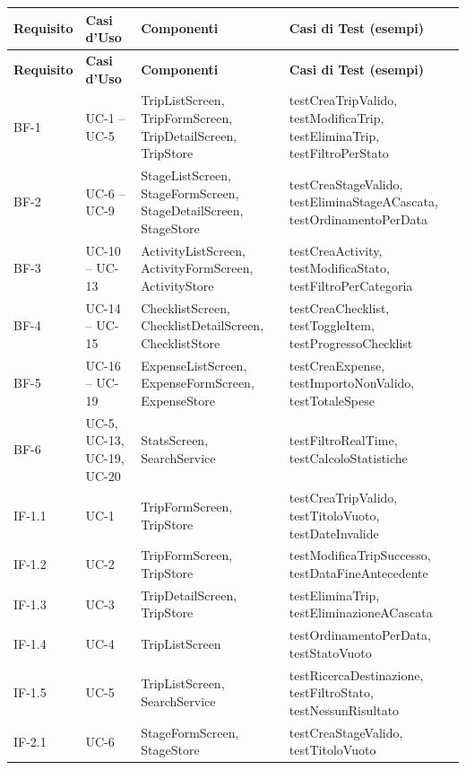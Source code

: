 \documentclass[12pt, a4paper]{article}
\begin{document}
\begingroup
\small
\setlength{\tabcolsep}{4pt}
\begin{longtable}{@{}L{1.8cm}L{3.5cm}L{3.5cm}L{5.2cm}@{}}
  \toprule
  \textbf{Requisito} & \textbf{Casi d'Uso} & \textbf{Componenti} & \textbf{Casi di Test (esempi)} \\
  \midrule
  \endfirsthead
  \toprule
  \textbf{Requisito} & \textbf{Casi d'Uso} & \textbf{Componenti} & \textbf{Casi di Test (esempi)} \\
  \midrule
  \endhead
  \bottomrule
  \endlastfoot

  BF-1 & UC-1 -- UC-5 & TripListScreen, TripFormScreen, TripDetailScreen, TripStore &
    testCreaTripValido, testModificaTrip, testEliminaTrip, testFiltroPerStato \\
  BF-2 & UC-6 -- UC-9 & StageListScreen, StageFormScreen, StageDetailScreen, StageStore &
    testCreaStageValido, testEliminaStageACascata, testOrdinamentoPerData \\
  BF-3 & UC-10 -- UC-13 & ActivityListScreen, ActivityFormScreen, ActivityStore &
    testCreaActivity, testModificaStato, testFiltroPerCategoria \\
  BF-4 & UC-14 -- UC-15 & ChecklistScreen, ChecklistDetailScreen, ChecklistStore &
    testCreaChecklist, testToggleItem, testProgressoChecklist \\
  BF-5 & UC-16 -- UC-19 & ExpenseListScreen, ExpenseFormScreen, ExpenseStore &
    testCreaExpense, testImportoNonValido, testTotaleSpese \\
  BF-6 & UC-5, UC-13, UC-19, UC-20 & StatsScreen, SearchService &
    testFiltroRealTime, testCalcoloStatistiche \\
  \midrule
  IF-1.1 & UC-1 & TripFormScreen, TripStore &
    testCreaTripValido, testTitoloVuoto, testDateInvalide \\
  IF-1.2 & UC-2 & TripFormScreen, TripStore &
    testModificaTripSuccesso, testDataFineAntecedente \\
  IF-1.3 & UC-3 & TripDetailScreen, TripStore &
    testEliminaTrip, testEliminazioneACascata \\
  IF-1.4 & UC-4 & TripListScreen &
    testOrdinamentoPerData, testStatoVuoto \\
  IF-1.5 & UC-5 & TripListScreen, SearchService &
    testRicercaDestinazione, testFiltroStato, testNessunRisultato \\
  IF-2.1 & UC-6 & StageFormScreen, StageStore &
    testCreaStageValido, testTitoloVuoto \\

\end{longtable}
\end{document}
